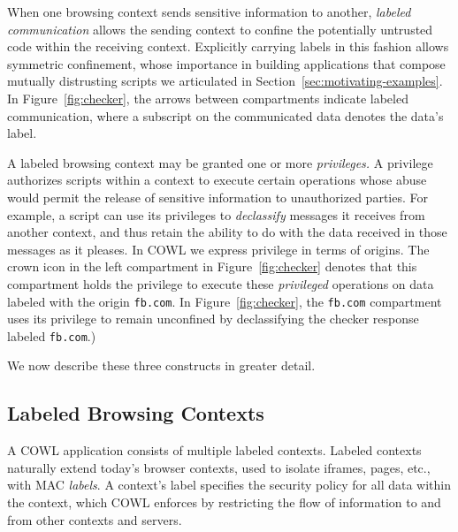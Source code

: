 When one browsing context sends sensitive information to
  another, {\em labeled communication} allows the sending context to
  confine the potentially untrusted code within the receiving
  context. Explicitly carrying labels in this fashion allows symmetric
  confinement, whose importance in building applications that compose
  mutually distrusting scripts we articulated in
  Section~\ref{sec:motivating-examples}. In Figure~\ref{fig:checker},
  the arrows between compartments indicate labeled communication,
  where a subscript on the communicated data denotes the data's label.

  A labeled browsing context may be granted one or more {\em
    privileges.} A privilege authorizes scripts within a context to
  execute certain operations whose abuse would permit the release of
  sensitive information to unauthorized parties. For example, a script
  can use its privileges to {\em declassify} messages it receives from
  another context, and thus retain the ability to do with the data
  received in those messages as it pleases. In COWL we express
  privilege in terms of origins. The crown icon in the left
  compartment in Figure~\ref{fig:checker} denotes that this
  compartment holds the privilege to execute these {\em privileged}
  operations on data labeled with the origin {\tt fb.com}. In
  Figure~\ref{fig:checker}, the {\tt fb.com} compartment uses its
  privilege to remain unconfined by declassifying the checker response
  labeled {\tt fb.com}.)

We now describe these three constructs in greater detail.



\subsection{Labeled Browsing Contexts}
\label{sec:system:contexts}
A COWL application consists of multiple labeled contexts.
%
Labeled contexts naturally extend today's browser contexts, used to
isolate iframes, pages, etc., with MAC \emph{labels}.
%
A context's label specifies the security policy for all data within
the context, which COWL enforces by restricting the flow of
information to and from other contexts and servers.

